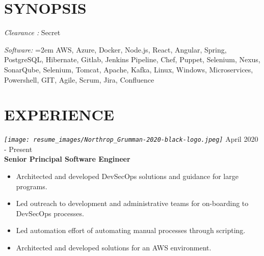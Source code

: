 \documentclass[12pt, line, margin]{res}
\begin{document}
    \begin{resume}

        \section{SYNOPSIS}
            {\sl Clearance :} Secret

            {\sl Software:}
              \hangindent=2em
              AWS, Azure, Docker, Node.js, React, Angular, Spring,\newline
              PostgreSQL, Hibernate, Gitlab, Jenkins Pipeline, Chef, Puppet,\newline
              Selenium, Nexus, SonarQube, Selenium, Tomcat, Apache, Kafka,\newline
              Linux, Windows, Microservices, Powershell, GIT, Agile, Scrum,\newline
              Jira, Confluence\newline

        \section{EXPERIENCE}
            {\sl
              \texttt{[image: resume\_images/Northrop\_Grumman-2020-black-logo.jpeg]}
            }
            \hfill April 2020 - Present \\
            \textbf{Senior Principal Software Engineer}
            \begin{itemize}  \itemsep -2pt %
              \item   Architected and developed DevSecOps solutions and guidance for
                          large programs.
              \item   Led outreach to development and administrative teams for \newline
                          on-boarding to DevSecOps processes.
              \item   Led automation effort of automating manual processes through
                          scripting.
              \item   Architected and developed solutions for an AWS environment.
            \end{itemize}



\end{resume}
\end{document}
